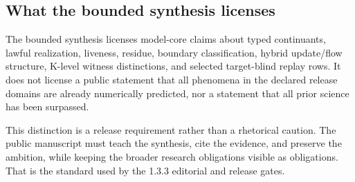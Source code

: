 \subsection{What the bounded synthesis licenses}

The bounded synthesis licenses model-core claims about typed continuants, lawful realization, liveness, residue, boundary classification, hybrid update/flow structure, K-level witness distinctions, and selected target-blind replay rows. It does not license a public statement that all phenomena in the declared release domains are already numerically predicted, nor a statement that all prior science has been surpassed.


This distinction is a release requirement rather than a rhetorical caution. The public manuscript must teach the synthesis, cite the evidence, and preserve the ambition, while keeping the broader research obligations visible as obligations. That is the standard used by the 1.3.3 editorial and release gates.
